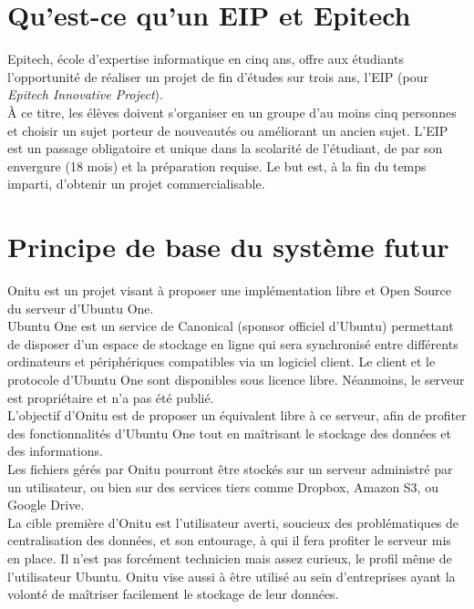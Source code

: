 \section{Qu'est-ce qu'un EIP et Epitech}
Epitech, école d'expertise informatique en cinq ans, offre aux étudiants l'opportunité de réaliser un projet de fin d'études sur trois ans, l'EIP (pour \emph{Epitech Innovative Project}).\\

À ce titre, les élèves doivent s'organiser en un groupe d'au moins cinq personnes et choisir un sujet porteur de nouveautés ou améliorant un ancien sujet. L'EIP est un passage obligatoire et unique dans la scolarité de l'étudiant, de par son envergure (18 mois) et la préparation requise. Le but est, à la fin du temps imparti, d'obtenir un projet commercialisable.


\section{Principe de base du système futur}
    Onitu est un projet visant à proposer une implémentation libre et Open Source du serveur d’Ubuntu One.\\

    Ubuntu One est un service de Canonical (sponsor officiel d'Ubuntu) permettant de disposer d’un espace de stockage en ligne qui sera synchronisé entre différents ordinateurs et périphériques compatibles via un logiciel client. Le client et le protocole d’Ubuntu One sont disponibles sous licence libre. Néanmoins, le serveur est propriétaire et n’a pas été publié.\\

    L'objectif d'Onitu est de proposer un équivalent libre à ce serveur, afin de profiter des fonctionnalités d’Ubuntu One tout en maîtrisant le stockage des données et des informations.\\

    Les fichiers gérés par Onitu pourront être stockés sur un serveur administré par un utilisateur, ou bien sur des services tiers comme Dropbox, Amazon S3, ou Google Drive.\\

    La cible première d'Onitu est l'utilisateur averti, soucieux des problématiques de centralisation des données, et son entourage, à qui il fera profiter le serveur mis en place. Il n'est pas forcément technicien mais assez curieux, le profil même de l'utilisateur Ubuntu.
    Onitu vise aussi à être utilisé au sein d'entreprises ayant la volonté de maîtriser facilement le stockage de leur données.\\
